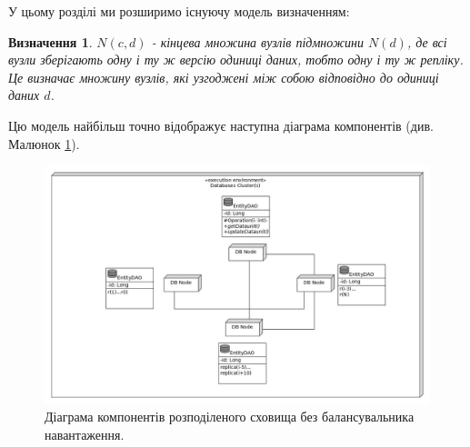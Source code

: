\documentclass[14pt]{vakthesis}
\newtheorem{definition}{Визначення}[chapter]
\begin{document}
У цьому розділі ми розширимо існуючу модель визначенням:

\begin{definition}
$N(c, d)$ - кінцева множина вузлів підмножини $N(d)$, де всі вузли зберігають одну і ту ж версію одиниці даних, тобто одну і ту ж репліку. Це визначає множину вузлів, які узгоджені між собою відповідно до одиниці даних $d$.


\end{definition}

Цю модель найбільш точно відображує наступна діаграма компонентів (див. Малюнок \ref{fig:d_components_without_lb}).


\begin{figure}
\centering

\includegraphics[width=\linewidth]{images/d_component_without_lb.jpg}
     \caption{Діаграма компонентів розподіленого сховища без балансувальника навантаження.}
     \label{fig:d_components_without_lb}
\end{figure}
\end{document}
